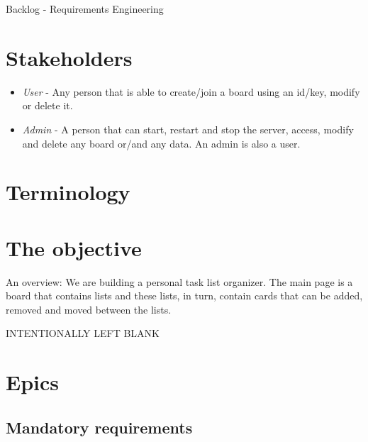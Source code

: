 \documentclass{article}
\begin{document}
	\vfill

	\begin{center}
		\Large{Backlog - Requirements Engineering}
	\end{center}

	\section{Stakeholders}

	\begin{itemize}
			\item \emph{User} - Any person that is able to create/join a board using an id/key, modify or delete it.
			\item \emph{Admin} - A person that can start, restart and stop the server, access, modify and delete any board or/and any data. An admin is also a user.

	\end{itemize}

	\section{Terminology}
	\vspace{-0.5cm}
	\printglossary[title={}]

	\section{The objective}

	An overview: We are building a personal task list organizer. The main page is a board that contains lists and these lists, in turn, contain cards that can be added, removed and moved between the lists.

	\vfill
	\begin{center} \LARGE \textcolor{black!50!red!50!white}{\scshape INTENTIONALLY LEFT BLANK} \end{center}
	\vfill


	\clearpage

	\section{Epics}

	\subsection{Mandatory requirements}
\end{document}
